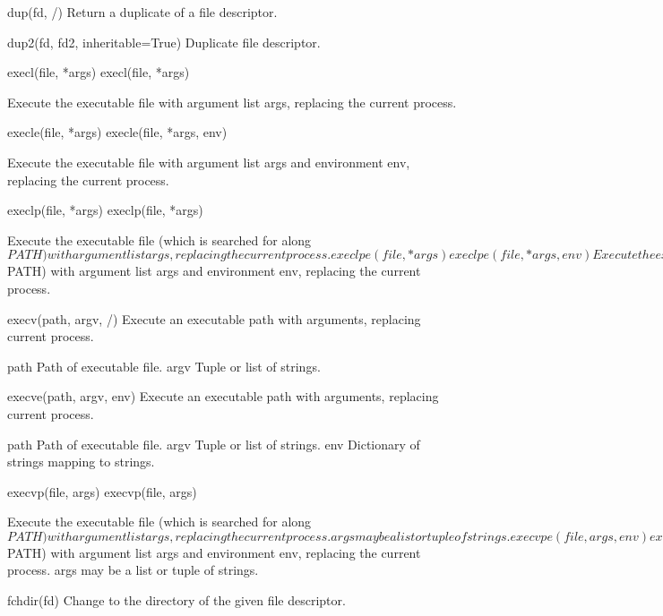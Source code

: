 \documentclass{article}
\begin{document}
    dup(fd, /)
        Return a duplicate of a file descriptor.

    dup2(fd, fd2, inheritable=True)
        Duplicate file descriptor.

    execl(file, *args)
        execl(file, *args)

        Execute the executable file with argument list args, replacing the
        current process.

    execle(file, *args)
        execle(file, *args, env)

        Execute the executable file with argument list args and
        environment env, replacing the current process.

    execlp(file, *args)
        execlp(file, *args)

        Execute the executable file (which is searched for along $PATH)
        with argument list args, replacing the current process.

    execlpe(file, *args)
        execlpe(file, *args, env)

        Execute the executable file (which is searched for along $PATH)
        with argument list args and environment env, replacing the current
        process.

    execv(path, argv, /)
        Execute an executable path with arguments, replacing current process.

        path
          Path of executable file.
        argv
          Tuple or list of strings.

    execve(path, argv, env)
        Execute an executable path with arguments, replacing current process.

        path
          Path of executable file.
        argv
          Tuple or list of strings.
        env
          Dictionary of strings mapping to strings.

    execvp(file, args)
        execvp(file, args)

        Execute the executable file (which is searched for along $PATH)
        with argument list args, replacing the current process.
        args may be a list or tuple of strings.

    execvpe(file, args, env)
        execvpe(file, args, env)

        Execute the executable file (which is searched for along $PATH)
        with argument list args and environment env, replacing the
        current process.
        args may be a list or tuple of strings.

    fchdir(fd)
        Change to the directory of the given file descriptor.
\end{document}
